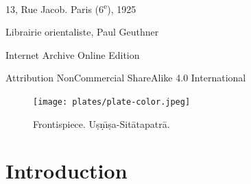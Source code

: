 \documentclass[a4paper, 12pt, oneside]{article}
\begin{document}
\begin{titlepage}
	\vspace*{\fill}%
	
	13, Rue Jacob. Paris (6\textsuperscript{e}), 1925 %
	
	{\small Librairie orientaliste, Paul Geuthner } %

	\vspace{1\baselineskip} %

    Internet Archive Online Edition  %
	
	{\small Attribution NonCommercial ShareAlike 4.0 International } %
\end{titlepage}
\setlength{\parskip}{1mm plus1mm minus1mm}
\setcounter{tocdepth}{3}
\setcounter{secnumdepth}{3}
\tableofcontents
\clearpage
\vspace*{\fill}
\begin{figure}[H]
\centering
\texttt{[image: plates/plate-color.jpeg]}
\caption*{Frontispiece. U\d{s}\d{n}\={\i}\d{s}a-Sit\={a}tapatr\={a}.}
\end{figure}
\vspace*{\fill}
\clearpage
\paragraph{}
\section*{Introduction}
\end{document}
